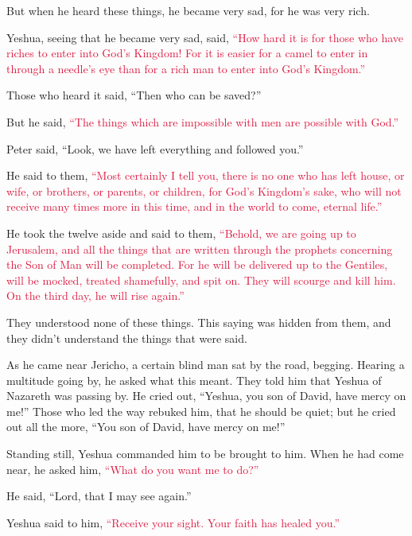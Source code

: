\myverse{}But when he heard these things, he became very sad, for he was
very rich.

\myverse{}Yeshua, seeing that he became very sad, said,
\textcolor{crimson}{“How hard it is for those who have riches to enter into God’s Kingdom!
}
\myverse{}\textcolor{crimson}{For it is easier for a camel to enter in through a needle’s eye than
	for a rich man to enter into God’s Kingdom.”}

\myverse{}Those who heard it said, “Then who can be saved?”

\myverse{}But he said,
\textcolor{crimson}{“The things which are impossible with men are possible with God.”}

\myverse{}Peter said, “Look, we have left everything and followed you.”

\myverse{}He said to them,
\textcolor{crimson}{“Most certainly I tell you, there is no one who has left house, or wife, or brothers, or parents,
	or children, for God’s Kingdom’s sake,
}
\myverse{}\textcolor{crimson}{who will not receive many times more in this time, and in the world to
	come, eternal life.”}

\myverse{}He took the twelve aside and said to them,
\textcolor{crimson}{“Behold, we are going up to Jerusalem, and all the things that are written through the prophets concerning
	the Son of Man will be completed.
}
\myverse{}\textcolor{crimson}{For he will be delivered up to the Gentiles, will be mocked, treated
	shamefully, and spit on.
}
\myverse{}\textcolor{crimson}{They will scourge and kill him. On the third day, he will rise again.”}

\myverse{}They understood none of these things. This saying was hidden
from them, and they didn’t understand the things that were said.

\myverse{}As he came near Jericho, a certain blind man sat by the road,
begging.
\myverse{}Hearing a multitude going by, he asked what this meant.
\myverse{}They told him that Yeshua of Nazareth was passing by.
\myverse{}He cried out, “Yeshua, you son of David, have mercy on me!”
\myverse{}Those who led the way rebuked him, that he should be quiet; but he cried
out all the more, “You son of David, have mercy on me!”

\myverse{}Standing still, Yeshua commanded him to be brought to him. When
he had come near, he asked him,
\myverse{}\textcolor{crimson}{“What do you want me to do?”}

He said, “Lord, that I may see again.”

\myverse{}Yeshua said to him,
\textcolor{crimson}{“Receive your sight. Your faith has healed you.”
}

